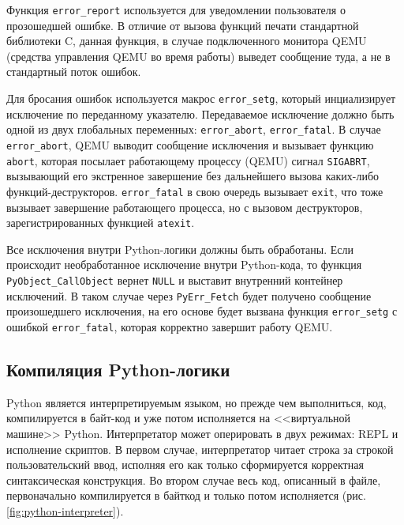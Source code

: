 Функция \texttt{error\_report} используется для уведомлении пользователя о
прозошедшей ошибке. В отличие от вызова функций печати стандартной библиотеки C,
данная функция, в случае подключенного монитора QEMU (средства управления QEMU
во время работы) выведет сообщение туда, а не в стандартный поток ошибок.

Для бросания ошибок используется макрос \texttt{error\_setg}, который инциализирует
исключение по переданному указателю. Передаваемое исключение должно быть одной из
двух глобальных переменных: \texttt{error\_abort}, \texttt{error\_fatal}.
В случае \texttt{error\_abort}, QEMU выводит сообщение исключения и вызывает
функцию \texttt{abort}, которая посылает работающему процессу (QEMU) сигнал
\texttt{SIGABRT}, вызывающий его экстренное завершение без дальнейшего вызова каких-либо
функций-деструкторов.
\texttt{error\_fatal} в свою очередь вызывает \texttt{exit}, что тоже вызывает
завершение работающего процесса, но с вызовом деструкторов, зарегистрированных
функцией \texttt{atexit}.

Все исключения внутри Python-логики должны быть обработаны. Если происходит
необработанное исключение внутри Python-кода, то функция \texttt{PyObject\_CallObject}
вернет \texttt{NULL} и выставит внутренний контейнер исключений.
В таком случае через \texttt{PyErr\_Fetch} будет получено сообщение произошедшего исключения,
на его основе будет вызвана функция \texttt{error\_setg} с ошибкой \texttt{error\_fatal},
которая корректно завершит работу QEMU.

\subsection{Компиляция Python-логики}\label{sec:ch2/sec1/sub6}

Python является интерпретируемым языком, но прежде чем выполниться,
код, компилируется в байт-код и уже потом исполняется на <<виртуальной машине>> Python.
Интерпретатор может оперировать в двух режимах: REPL и исполнение скриптов.
В первом случае, интерпретатор читает строка за строкой пользовательский
ввод, исполняя его как только сформируется корректная синтаксическая конструкция.
Во втором случае весь код, описанный в файле, первоначально компилируется в байткод и только потом исполняется
(рис. \ref{fig:python-interpreter}).

